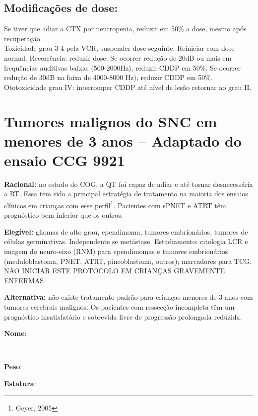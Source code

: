 \documentclass[11pt,a4paper,oldfontcommands]{memoir}
\def\entrywithlabel[#1]#2{\parbox{#1}{{\small #2:} \hrulefill}}
\begin{document}
\subsection{Modificações de dose:}
Se tiver que adiar a CTX por neutropenia, reduzir em 50\% a dose, mesmo após recuperação.\\
Toxicidade grau 3-4 pela VCR, suspender dose seguinte. Reiniciar com dose normal. Recorrência: reduzir dose.
Se ocorrer redução de 20dB ou mais em frequências auditivas baixas (500-2000Hz), reduzir CDDP em 50\%. Se ocorrer redução de 30dB na faixa de 4000-8000 Hz), reduzir CDDP em 50\%. Ototoxicidade grau IV: interromper CDDP até nível de lesão retornar ao grau II.\\
\cleardoublepage
\section{Tumores malignos do SNC em menores de 3 anos -- Adaptado do ensaio CCG 9921}
{\let\thefootnote\relax{}}
\small
\textbf{Racional:} no estudo do COG, a QT foi capaz de adiar e até tornar desnecessária a RT. Essa tem sido a principal estratégia de tratamento na maioria dos ensaios clínicos em crianças com esse perfil\footnote{Geyer, 2005}. Pacientes com sPNET e ATRT têm prognóstico bem inferior que os outros.

\textbf{Elegível:} gliomas de alto grau, ependimoma, tumores embrionários, tumores de células germinativas. Independente se metástase. Estadiamento: citologia LCR e imagem do neuro-eixo (RNM) para ependimomas e tumores embrionários (meduloblastoma, PNET, ATRT, pineoblastoma, outros); marcadores para TCG. NÃO INICIAR ESTE PROTOCOLO EM CRIANÇAS GRAVEMENTE ENFERMAS.

\textbf{Alternativa:} não existe tratamento padrão para crianças menores de 3 anos com tumores cerebrais malignos. Os pacientes com ressecção incompleta têm um prognóstico insatisfatório e sobrevida livre de progressão prolongada reduzida.
\\[0.4cm]
\entrywithlabel[1\hsize]{\textbf{Nome}}\hfill
\\[0.3cm]
\entrywithlabel[.45\hsize]{\textbf{Peso}}\hfill  \entrywithlabel[.45\hsize]{\textbf{Estatura}}
\end{document}
